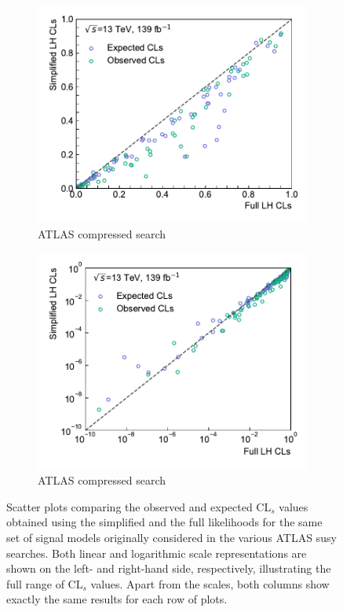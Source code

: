 \begin{figure}
\begin{subfigure}[b]{0.5\textwidth}
		\centering\includegraphics[width=\textwidth]{cls_scatter_compressed_lin}
		\caption{ATLAS compressed search~\cite{SUSY-2018-16}}
	\end{subfigure}\hfill
	\begin{subfigure}[b]{0.5\textwidth}
		\centering\includegraphics[width=\textwidth]{cls_scatter_compressed_log}
		\caption{ATLAS compressed search~\cite{SUSY-2018-16}}
	\end{subfigure}\hfill
	\caption{Scatter plots comparing the observed and expected CL$_s$ values obtained using the simplified and the full likelihoods for the same set of signal models originally considered in the various ATLAS \gls{susy} searches. Both linear and logarithmic scale representations are shown on the left- and right-hand side, respectively, illustrating the full range of CL$_s$ values. Apart from the scales, both columns show exactly the same results for each row of plots.}\label{fig:app_results_cls_2}
\end{figure}


